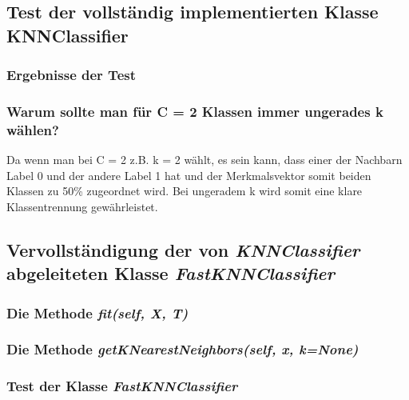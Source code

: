 \subsection{Test der vollständig implementierten Klasse KNNClassifier}

\subsubsection{Ergebnisse der Test}

\subsubsection{Warum sollte man für C = 2 Klassen immer ungerades k wählen?}

Da wenn man bei C = 2 z.B. k = 2 wählt, es sein kann, dass einer der Nachbarn Label 0 und der andere Label 1 hat und der Merkmalsvektor somit beiden Klassen zu 50\% zugeordnet wird. Bei ungeradem k wird somit eine klare Klassentrennung
gewährleistet.

\subsection{Vervollständigung der von \textit{KNNClassifier} abgeleiteten Klasse \textit{FastKNNClassifier}}


\subsubsection{Die Methode \textit{fit(self, X, T)}}


\subsubsection{Die Methode \textit{getKNearestNeighbors(self, x, k=None)}}


\subsubsection{Test der Klasse \textit{FastKNNClassifier}}

